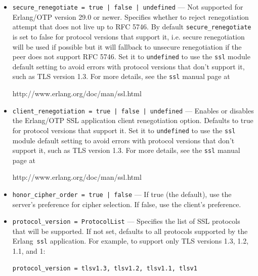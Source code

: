 \documentclass[11pt,oneside,english]{book}
\newcommand{\Erlang}            %
        {{\sc Erlang}}
\begin{document}
\begin{itemize}
\begin{itemize}
               \item \verb+secure_renegotiate = true | false | undefined+ ---
                 Not supported for Erlang/OTP version 29.0 or
                 newer. Specifies whether to reject renegotiation attempt
                 that does not live up to RFC 5746. By default
                 \verb+secure_renegotiate+ is set to false for protocol
                 versions that support it, i.e. secure renegotiation will
                 be used if possible but it will fallback to unsecure
                 renegotiation if the peer does not support RFC 5746. Set
                 it to \verb+undefined+ to use the \verb+ssl+ module
                 default setting to avoid errors with protocol versions
                 that don't support it, such as TLS version 1.3. For more
                 details, see the \verb+ssl+ manual page at

                 http://www.erlang.org/doc/man/ssl.html

               \item \verb+client_renegotiation = true | false | undefined+ ---
                 Enables or disables the Erlang/OTP SSL application client
                 renegotiation option. Defaults to true for protocol versions
                 that support it. Set it to \verb+undefined+ to use the
                 \verb+ssl+ module default setting to avoid errors with protocol
                 versions that don't support it, such as TLS version 1.3. For more
                 details, see the \verb+ssl+ manual page at

                 http://www.erlang.org/doc/man/ssl.html

               \item \verb+honor_cipher_order = true | false+ --- If true (the
                 default), use the server's preference for cipher selection. If
                 false, use the client's preference.

                 \item \verb+protocol_version = ProtocolList+ ---
                   Specifies the list of SSL protocols that will be
                   supported. If not set, defaults to all protocols
                   supported by the \Erlang\ \verb+ssl+
                   application. For example, to support only TLS
                   versions 1.3, 1.2, 1.1, and 1:

\begin{verbatim}
protocol_version = tlsv1.3, tlsv1.2, tlsv1.1, tlsv1
\end{verbatim}


\end{itemize}
\end{itemize}
\end{document}
